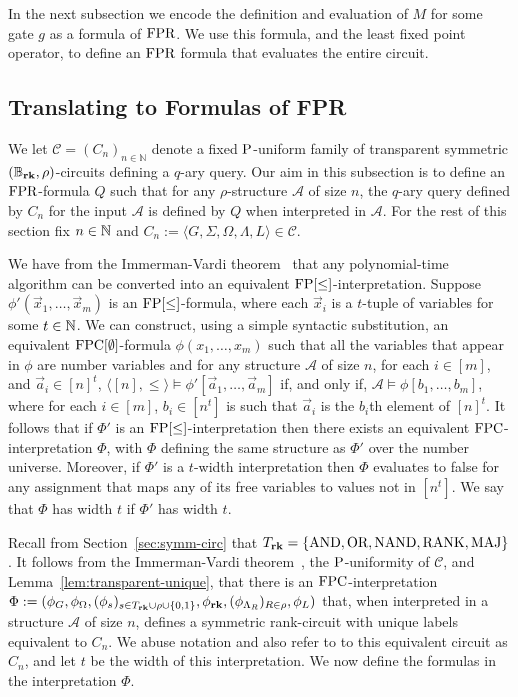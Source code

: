 \documentclass[../main/thesis.tex]{subfiles}
\begin{document}
In the next subsection we encode the definition and evaluation of $M$ for some
gate $g$ as a formula of $\text{\upshape FPR}$. We use this formula, and the least fixed point
operator, to define an $\text{\upshape FPR}$ formula that evaluates the entire circuit.

\subsection{Translating to Formulas of FPR}
\label{sec:translating-formulas-to-FPR}
We let $\mathcal{C} = (C_n)_{n \in \mathbb{N}}$ denote a fixed $\mathrm{P}$-uniform
family of transparent symmetric $(\mathbb{B}_{\text{\textbf{rk}}}, \rho)$-circuits defining a $q$-ary query.
Our aim in this subsection is to define an $\text{\upshape FPR}$-formula $Q$ such that for any
$\rho$-structure $\mathcal{A}$ of size $n$, the $q$-ary query defined by $C_n$
for the input $\mathcal{A}$ is defined by $Q$ when interpreted in $\mathcal{A}$.
For the rest of this section fix $n \in \mathbb{N}$ and $C_n := \langle G, \Sigma,
\Omega, \Lambda, L \rangle \in \mathcal{C}$.

We have from the Immerman-Vardi theorem~\cite{Immerman198686, Vardi:1982} that
any polynomial-time algorithm can be converted into an equivalent
$\text{\upshape FP}[\leq]$-interpretation. Suppose $\phi'(\vec{x}_1, \ldots , \vec{x}_m)$ is an
$\text{\upshape FP}[\leq]$-formula, where each $\vec{x}_i$ is a $t$-tuple of variables for some
$t \in \mathbb{N}$. We can construct, using a simple syntactic substitution, an
equivalent $\text{\upshape FPC}[\emptyset]$-formula $\phi(x_1, \ldots , x_m)$ such that all the
variables that appear in $\phi$ are number variables and for any structure
$\mathcal{A}$ of size $n$, for each $i \in [m]$, and $\vec{a}_i \in [n]^{t}$,
$\langle [n], \leq \rangle \models \phi'[\vec{a}_1 , \ldots, \vec{a}_m]$ if, and
only if, $\mathcal{A} \models \phi[b_1, \ldots, b_m]$, where for each $i \in
[m]$, $b_i \in [n^t]$ is such that $\vec{a}_i$ is the $b_i$th element of
$[n]^t$. It follows that if $\Phi'$ is an $\text{\upshape FP}[\leq]$-interpretation then there
exists an equivalent $\text{\upshape FPC}$-interpretation $\Phi$, with $\Phi$ defining the same
structure as $\Phi'$ over the number universe. Moreover, if $\Phi'$ is a
$t$-width interpretation then $\Phi$ evaluates to false for any assignment that
maps any of its free variables to values not in $[n^t]$. We say that $\Phi$ has
width $t$ if $\Phi'$ has width $t$.

Recall from Section~\ref{sec:symm-circ} that $T_{\text{\textbf{rk}}} = \{\text{\upshape AND}, \text{\upshape OR}, \text{\upshape NAND},
\text{\upshape RANK}, \text{\upshape MAJ}\}$. It follows from the Immerman-Vardi theorem~\cite{Immerman198686,
  Vardi:1982}, the $\mathrm{P}$-uniformity of $\mathcal{C}$, and
Lemma~\ref{lem:transparent-unique}, that there is an $\text{\upshape FPC}$-interpretation $\Phi
:= (\phi_G, \phi_\Omega, (\phi_s)_{ s \in T_{\text{\textbf{rk}}} \cup \rho \cup \{0,1\}},
\phi_{\text{\textbf{rk}}}, (\phi_{\Lambda_R})_{R \in \rho}, \phi_L)$ that, when interpreted
in a structure $\mathcal{A}$ of size $n$, defines a symmetric rank-circuit with
unique labels equivalent to $C_n$. We abuse notation and also refer to to this
equivalent circuit as $C_n$, and let $t$ be the width of this interpretation. We
now define the formulas in the interpretation $\Phi$.
\end{document}
